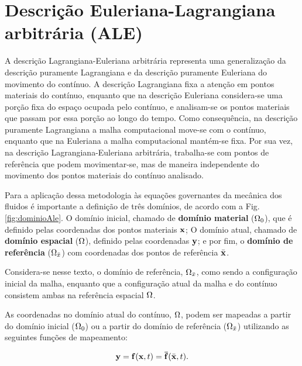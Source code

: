 \documentclass[tese_patricia]{subfiles}%
\begin{document}
\section{Descrição Euleriana-Lagrangiana arbitrária (ALE)} \label{capitulo:Cap2:ALE}

A descrição Lagrangiana-Euleriana arbitrária \cite{DoneaGH:1982} representa uma generalização da descrição puramente Lagrangiana e da descrição puramente Euleriana do movimento do contínuo. A descrição Lagrangiana fixa a atenção em pontos materiais do contínuo, enquanto que na descrição Euleriana considera-se uma porção fixa do espaço ocupada pelo contínuo, e analisam-se os pontos materiais que passam por essa porção ao longo do tempo. Como consequência, na descrição puramente Lagrangiana a malha computacional move-se com o contínuo, enquanto que na Euleriana a malha computacional mantém-se fixa. Por sua vez, na descrição Lagrangiana-Euleriana arbitrária, trabalha-se com pontos de referência que podem movimentar-se, mas de maneira independente do movimento dos pontos materiais do contínuo analisado.

Para a aplicação dessa metodologia às equações governantes da mecânica dos fluidos é importante a definição de três domínios, de acordo com a Fig. \ref{fig:dominioAle}. O domínio inicial, chamado de \textbf{domínio material} ($\Omega_{0}$), que é definido pelas coordenadas dos pontos materiais $\mathbf{x}$; O domínio atual, chamado de \textbf{domínio espacial} ($\Omega$), definido pelas coordenadas $\mathbf{y}$; e por fim, o \textbf{domínio de referência} ($\Omega_{\bar{x}}$) com coordenadas dos pontos de referência $\bar{\mathbf{x}}$. 

Considera-se nesse texto, o domínio de referência, $\Omega_{\bar{x}}$, como sendo a configuração inicial da malha, enquanto que a configuração atual da malha e do contínuo consistem ambas na referência espacial $\Omega$.

As coordenadas no domínio atual do contínuo, $\Omega$, podem ser mapeadas a partir do domínio inicial ($\Omega_{0}$) ou a partir do domínio de referência ($\Omega_{\bar{x}}$) utilizando as seguintes funções de mapeamento:  

\begin{align}
	\mathbf{y} = \mathbf{f}(\mathbf{x},t) = \mathbf{\bar{f}}(\bar{\mathbf{x}},t).
\end{align}
\end{document}
